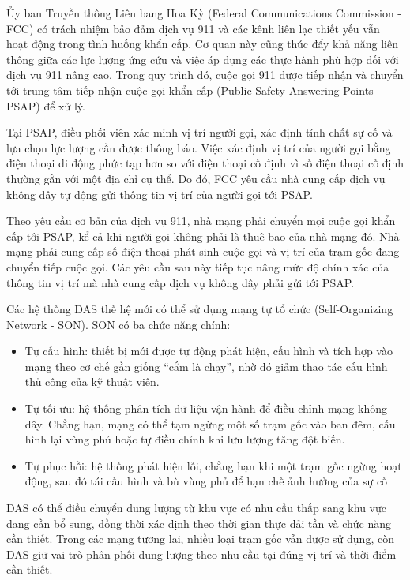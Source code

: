 \documentclass{thesis}
\begin{document}
Ủy ban Truyền thông Liên bang Hoa Kỳ (Federal Communications
Commission - FCC) có trách nhiệm bảo đảm
dịch vụ 911 và các kênh liên lạc thiết yếu vẫn hoạt động trong tình
huống khẩn cấp. Cơ quan này cũng thúc đẩy khả năng liên thông giữa
các lực lượng ứng cứu và việc áp dụng các thực hành phù hợp đối với
dịch vụ 911 nâng cao. Trong quy trình đó, cuộc gọi 911 được tiếp nhận
và chuyển tới trung tâm tiếp nhận cuộc gọi khẩn cấp (Public Safety
Answering Points - PSAP) để xử lý.

Tại PSAP, điều phối viên xác minh vị trí người gọi, xác định tính
chất sự cố và lựa chọn lực lượng cần được thông báo. Việc xác định vị
trí của người gọi bằng điện thoại di động phức tạp hơn so với điện
thoại cố định vì số điện thoại cố định thường gắn với một địa chỉ cụ
thể. Do đó, FCC yêu cầu nhà cung cấp dịch vụ không dây tự động gửi
thông tin vị trí của người gọi tới PSAP.

Theo yêu cầu cơ bản của dịch vụ 911, nhà mạng phải chuyển mọi cuộc
gọi khẩn cấp tới PSAP, kể cả khi người gọi không phải là thuê bao của
nhà mạng đó. Nhà mạng phải cung cấp số điện thoại phát sinh cuộc gọi
và vị trí của trạm gốc đang chuyển tiếp cuộc gọi. Các yêu cầu sau này
tiếp tục nâng mức độ chính xác của thông tin vị trí mà nhà cung cấp
dịch vụ không dây phải gửi tới PSAP.

Các hệ thống DAS thế hệ mới có thể sử dụng mạng tự tổ chức
(Self-Organizing Network - SON). SON có ba chức năng chính:

\begin{itemize}
  \item Tự cấu hình: thiết bị mới được tự động phát hiện, cấu hình và
    tích hợp vào mạng theo cơ chế gần giống “cắm là chạy”, nhờ đó
    giảm thao tác cấu hình thủ công của kỹ thuật viên.
  \item Tự tối ưu: hệ thống phân tích dữ liệu vận hành để điều chỉnh
    mạng không dây. Chẳng hạn, mạng có thể tạm ngừng một số trạm gốc
    vào ban đêm, cấu hình lại vùng phủ hoặc tự điều chỉnh khi lưu
    lượng tăng đột biến.
  \item Tự phục hồi: hệ thống phát hiện lỗi, chẳng hạn khi một trạm
    gốc ngừng hoạt động, sau đó tái cấu hình và bù vùng phủ để hạn
    chế ảnh hưởng của sự cố
\end{itemize}

DAS có thể điều chuyển dung lượng từ khu vực có nhu cầu thấp sang khu
vực đang cần bổ sung, đồng thời xác định theo thời gian thực dải tần
và chức năng cần thiết. Trong các mạng tương lai, nhiều loại trạm gốc
vẫn được sử dụng, còn DAS giữ vai trò phân phối dung lượng theo nhu
cầu tại đúng vị trí và thời điểm cần thiết.
\end{document}
